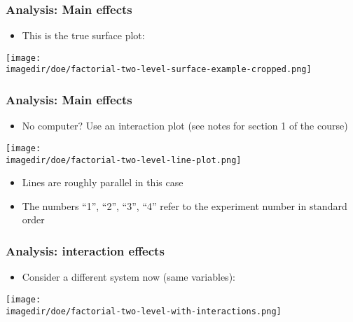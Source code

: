 \begin{frame}\frametitle{Analysis: Main effects}
	\begin{itemize}
		\item	This is the true surface plot:
	\end{itemize}
	\begin{center}
		\texttt{[image: \\imagedir/doe/factorial-two-level-surface-example-cropped.png]}
	\end{center}
\end{frame}

\begin{frame}\frametitle{Analysis: Main effects}
	\begin{itemize}
		\item	No computer? Use an interaction plot {\scriptsize (see notes for section 1 of the course)}
	\end{itemize}
	\begin{center}
		\texttt{[image: \\imagedir/doe/factorial-two-level-line-plot.png]}
	\end{center}
	\begin{itemize}
		\item	Lines are roughly parallel in this case
		\item	The numbers ``1'', ``2'', ``3'', ``4'' refer to the experiment number in standard order
	\end{itemize}
\end{frame}

\begin{frame}\frametitle{Analysis: interaction effects}
	\begin{itemize}
		\item	Consider a different system now (same variables):
	\end{itemize}
	\begin{center}
		\texttt{[image: \\imagedir/doe/factorial-two-level-with-interactions.png]}
	\end{center}
\end{frame}

